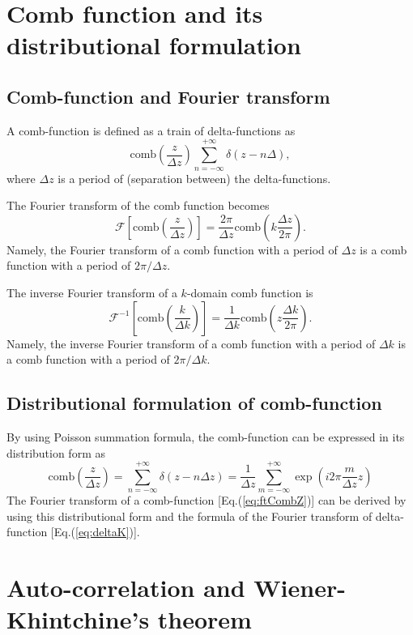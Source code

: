 \documentclass[a4paper]{article}
\newcommand{\ftf}[1]{{\mathcal{F}\left[#1\right]\xspace}}
\newcommand{\iftf}[1]{{\mathcal{F}^{-1}\left[#1\right]\xspace}}
\newcommand{\comb}[1]{{\mathrm{comb}\left( #1 \right)}\xspace}
\newcommand{\Dz}{{\Delta z}\xspace}
\newcommand{\Dk}{{\Delta k}\xspace}
\begin{document}
\section{Comb function and its distributional formulation}
\subsection*{Comb-function and Fourier transform}
A comb-function is defined as a train of delta-functions as
\begin{equation}
	\comb{ \frac{z}{\Dz} }
	\sum_{n = -\infty}^{+\infty} \delta\left( z- n\Delta \right),
\end{equation}
where $\Delta z$ is a period of (separation between) the delta-functions.

The Fourier transform of the comb function becomes
\begin{equation}
	\label{eq:ftCombZ}
	\ftf{ \comb{\frac{z}{\Dz}} }  = \frac{2\pi}{\Dz} \comb{k\frac{\Dz}{2 \pi}}.
\end{equation}
Namely, the Fourier transform of a comb function with a period of $\Delta z$ is a comb function with a period of $2\pi/\Dz$.

The inverse Fourier transform of a $k$-domain comb function is
\begin{equation}
	\iftf{\comb{\frac{k}{\Dk}}} = \frac{1}{\Dk} \comb{z\frac{\Dk}{2\pi}}.
\end{equation}
Namely, the inverse Fourier transform of a comb function with a period of $\Dk$ is a comb function with a period of $2\pi/\Dk$.

\subsection*{Distributional formulation of comb-function}
By using Poisson summation formula, the comb-function can be expressed in its distribution form as
\begin{equation}
	\comb{\frac{z}{\Dz}} 
	= \sum_{n = -\infty}^{+\infty} \delta\left( z-n\Dz \right)
	= \frac{1}{\Dz} \sum_{m=-\infty}^{+\infty} \exp\left(i2\pi \frac{m}{\Dz} z\right)
\end{equation}
The Fourier transform of a comb-function [Eq.\@ (\ref{eq:ftCombZ})] can be derived by using this distributional form and the formula of the Fourier transform of delta-function [Eq.\@ (\ref{eq:deltaK})].

\section{Auto-correlation and Wiener-Khintchine’s theorem}
\end{document}
